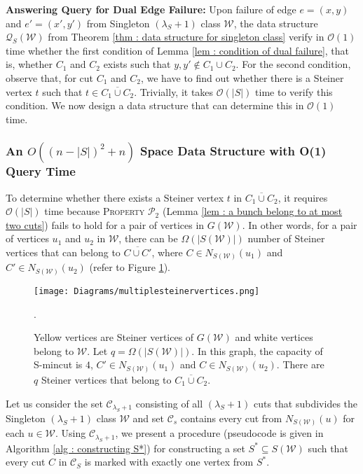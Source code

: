 \documentclass[letterpaper,11pt]{article}
\begin{document}
\noindent
\textbf{Answering Query for Dual Edge Failure:}
Upon failure of edge $e=(x,y)$ and $e'=(x',y')$ from  Singleton $(\lambda_S+1)$ class ${\mathcal W}$, the data structure ${\mathcal Q}_S({\mathcal W})$ from Theorem \ref{thm : data structure for singleton class} verify in ${\mathcal O}(1)$ time whether the first condition of Lemma \ref{lem : condition of dual failure}, that is, whether $C_1$ and $C_2$ exists such that $y,y'\notin C_1\cup C_2$. For the second condition, observe that, for cut $C_1$ and $C_2$, we have to find out whether there is a Steiner vertex $t$ such that $t\in \overline{C_1 \cup C_2}$. Trivially, it takes ${\mathcal O}(|S|)$ time to verify this condition. We now design a data structure that can determine this in ${\mathcal O}(1)$ time. 

\subsubsection*{An $O((n-|S|)^{2}+n)$ Space Data Structure with O(1) Query Time}
To determine whether there exists a Steiner vertex $t$ in $\overline{C_1\cup C_2}$, it requires ${\mathcal O}(|S|)$ time because \textsc{Property ${\mathcal P}_2$} (Lemma \ref{lem : a bunch belong to at most two cuts}) fails to hold for a pair of vertices in $G({\mathcal W})$. In other words, for a pair of vertices $u_1$ and $u_2$ in ${\mathcal W}$, there can be $\Omega(|S({\mathcal W})|)$ number of Steiner vertices that can belong to $\overline{C\cup C'}$, where $C\in N_{S({\mathcal W})}(u_1)$ and $C'\in N_{S({\mathcal W})}(u_2)$ (refer to Figure \ref{fig : 2nd figure in overview}). 


  \begin{figure}
 \centering
    \texttt{[image: Diagrams/multiplesteinervertices.png]} 
   \caption{Yellow vertices are Steiner vertices of $G({\mathcal W})$ and white vertices belong to ${\mathcal W}$. Let $q={\Omega}(|S({\mathcal W})|)$. In this graph, the capacity of S-mincut is $4$, $C'\in N_{S({\mathcal W})}(u_1)$ and $C\in N_{S({\mathcal W})}(u_2)$. There are $q$ Steiner vertices that belong to $\overline{C_1\cup C_2}$. }
  \label{fig : 2nd figure in overview}. 
\end{figure}

Let us consider the set ${\mathcal C}_{\lambda_S+1}$ consisting of all $(\lambda_S+1)$ cuts that subdivides the Singleton $(\lambda_S+1)$ class ${\mathcal W}$ and set ${\mathcal C}_s$ contains every cut from $N_{S({\mathcal W})}(u)$ for each $u\in {\mathcal W}$. Using ${\mathcal C}_{\lambda_S+1}$, we present a procedure (pseudocode is given in Algorithm \ref{alg : constructing S*}) for constructing a set $S^*\subseteq S({\mathcal W})$ such that every cut $C$ in ${\mathcal C}_S$ is marked with exactly one vertex from $S^*$. \\
\end{document}
